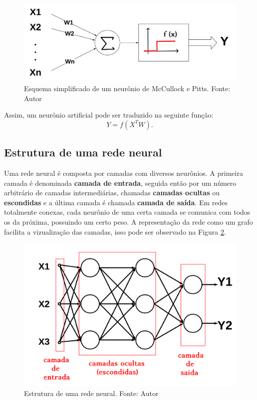 \documentclass[a4paper,12pt]{article}
\begin{document}
\begin{figure}[H]
\centering 
\includegraphics[scale=0.3]{Figuras/neuronio.png}
\caption{Esquema simplificado de um neurônio de McCullock e Pitts. Fonte: Autor} 
\label{fig:neuron}
\end{figure} 

Assim, um neurônio artificial pode ser traduzido na seguinte função:
$$Y = f(X^{T}W).$$

\subsection{Estrutura de uma rede neural}
Uma rede neural é composta por camadas com diversos neurônios. A primeira camada é denominada \textbf{camada de entrada}, seguida então por um número arbitrário de camadas intermediárias, chamadas \textbf{camadas ocultas} ou \textbf{escondidas} e a última camada é chamada \textbf{camada de saída}. Em redes totalmente conexas, cada neurônio de uma certa camada se comunica com todos os da próxima, possuindo um certo peso. A representação da rede como um grafo facilita a vizualização das camadas, isso pode ser observado na Figura \ref{fig:layers}.


\begin{figure}[H]
\centering 
\includegraphics[scale=0.3]{Figuras/layers.png}
\caption{Estrutura de uma rede neural. Fonte: Autor} 
\label{fig:layers}
\end{figure} 
\end{document}

